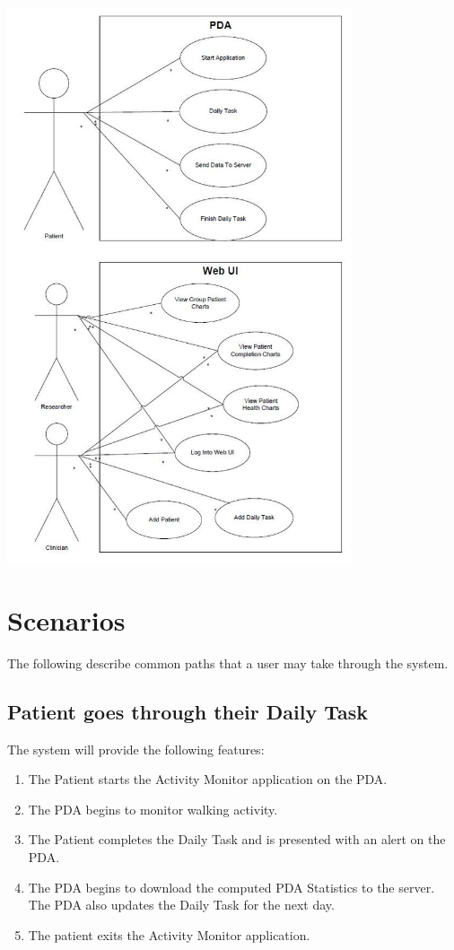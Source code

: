 \documentclass{article}
\begin{document}
\begin{center}
\includegraphics[width=4in, height=6.46in]{HLDuseCaseDiagram.jpg}
\label{fig:usecase}
\end{center}


\section{Scenarios}
The following describe common paths that a user may take through the system.

\subsection{Patient goes through their Daily Task}	
The system will provide the following features:
\begin{enumerate}
\item The Patient starts the Activity Monitor application on the PDA.
\item The PDA begins to monitor walking activity. 
\item The Patient completes the Daily Task and is presented with an alert on the PDA. 
\item The PDA begins to download the computed PDA Statistics to the server. The PDA also updates the Daily Task for the next day. 
\item The patient exits the Activity Monitor application.
\end{enumerate} 
\end{document}

